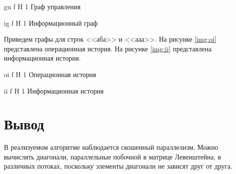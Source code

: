 {gu} %
{f} %
{H} %
{1\textwidth} %
{Граф управления} %


{ig} %
{f} %
{H} %
{1\textwidth} %
{Информационный граф} %


Приведем графы для строк <<аба>> и <<ааа>>. На рисунке \ref{img:oi} представлена операционная история. На рисунке \ref{img:ii} представлена информационная история.

{oi} %
{f} %
{H} %
{1\textwidth} %
{Операционная история} %


{ii} %
{f} %
{H} %
{1\textwidth} %
{Информационная история} %

\section*{Вывод}

В реализуемом алгоритме наблюдается скошенный параллелизм. Можно вычислять диагонали, параллельные побочной в матрице Левенштейна, в различных потоках, поскольку элементы диагонали не зависят друг от друга.
